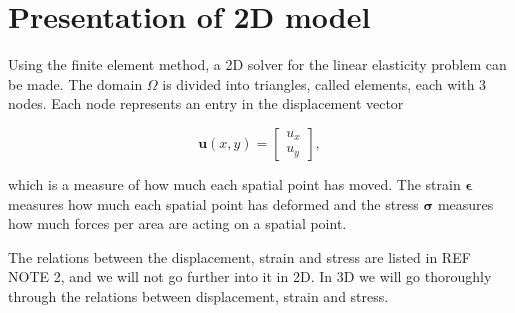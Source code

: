 \section{Presentation of 2D model}

Using the finite element method, a 2D solver for the linear elasticity problem can be made. The domain $\Omega$ is divided into triangles, called elements, each with 3 nodes. Each node represents an entry in the displacement vector

\begin{equation}
\bm{u}(x,y) = 
\begin{bmatrix}
u_x \\
u_y
\end{bmatrix},
\end{equation}

which is a measure of how much each spatial point has moved. The strain $\bm{\epsilon}$ measures how much each spatial point has deformed and the stress $\bm{\sigma}$ measures how much forces per area are acting on a spatial point. 

The relations between the displacement, strain and stress are listed in REF NOTE 2, and we will not go further into it in 2D. In 3D we will go thoroughly through the relations between displacement, strain and stress. 



